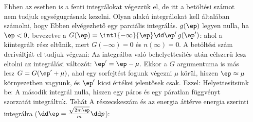     Ebben az esetben is a fenti integrálokat végezzük el, de itt a betöltési számot nem tudjuk egységugrásnak kezelni.
   Olyan alakú integrálokat kell általában számolni, hogy 
    Ebben elvégezhető egy parciális integrálás. $g(\ep)$ legyen nulla, ha $\ep<0$, bevezetve a $G(\ep)=\intl{-\infty}{\ep}\dd\ep'\,g(\ep')$:
    ahol a kiintegrált rész eltűnik, mert $G(-\infty)=0$ és $n(\infty)=0$.
   A betöltési szám deriváltját el tudjuk végezni:
    Az integrálba való behelyettesítés után célszerű lesz eltolni az integrálási változót: $\ep'=\ep-\mu$.
   Ekkor a $G$ argumentuma is más lesz $G=G(\ep'+\mu)$, ahol egy sorfejtést fogunk végezni $\mu$ körül, hiszen $\ep\approx \mu$ környezetben vagyunk, és $\ep'$ kicsi értékei jelentősek csak.
   Ezzel:
    Helyettesítsünk be:
    A második integrál nulla, hiszen egy páros és egy páratlan függvényt szorzatát integráltuk.
   Tehát
    A részecskeszám és az energia áttérve energia szerinti integrálra ($\dd \ep=\frac{\sqrt{2m\ep}}{m}\dd p$):

